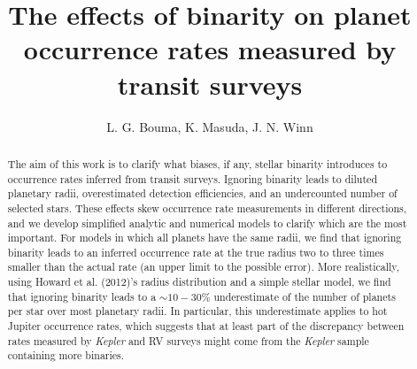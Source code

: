 \documentclass[12pt,modern]{aastex61}
\begin{document}
    
\title{ The effects of binarity on planet occurrence rates measured by transit 
surveys}

\author{
L. G. Bouma, K. Masuda, J. N. Winn
}

\begin{abstract}

The aim of this work is to clarify what biases, if any, stellar binarity 
introduces to occurrence rates inferred from transit surveys.
Ignoring binarity leads to diluted planetary radii, overestimated 
detection efficiencies, and an undercounted number of selected stars.
These effects skew occurrence rate measurements in different directions, and 
we develop simplified analytic and numerical models to clarify which are the 
most important.
For models in which all planets have the same radii, we find that 
ignoring binarity leads to an inferred occurrence rate at the true radius two 
to three times smaller than the actual rate (an upper limit to the possible 
error).
More realistically, using Howard et al. (2012)'s radius distribution and a 
simple stellar model, we find that ignoring binarity leads to a $\sim10-30\%$ 
underestimate of the number of planets per star over most planetary radii.
In particular, this underestimate applies to hot Jupiter occurrence rates, 
which suggests that at least part of the discrepancy between rates measured by 
{\it Kepler} and RV surveys might come from the {\it Kepler} sample 
containing more binaries.

\end{abstract}








\end{document}
